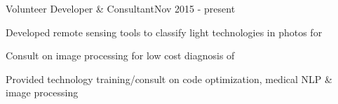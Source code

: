 \documentclass{article}
\newenvironment{**mylist}[2]{
  \subsubsection*{#1\hfill#2}
  \small
  \begin{list}{}{}
    \setlength{\topsep}{0pt}
   \setlength{\itemsep}{1pt}
   \setlength{\parskip}{0pt}
   \setlength{\parsep}{0pt}}{\end{list}\normalsize}
\newcommand{\LU}[1]{\hspace{-1em}{\bf Technologies : #1}}
\def\PT{{\bf(Part Time)}\xspace}
\begin{document}
\begin{**mylist}{ \tabb Volunteer Developer \& Consultant}{Nov 2015 - present}
\item Developed remote sensing tools to classify light technologies in photos for 
\item Consult on image processing for low cost diagnosis of 
\item Provided technology training/consult on code optimization, medical NLP \& image processing
\end{**mylist}

\begin{comment}
\begin{**mylist}{\censor{ComScore}
    \tabb Software Contractor}{June 2016 - Sept 2016}
\item Worked to support large, custom, memory mapped, data store for demographic analysis
\end{**mylist}
\end{comment}

\begin{comment}
\begin{**mylist}{\href{http://www.melinae.com/}{\censor{Melinae}} \PT \tabb Contractor}{March 2016}
\end{**mylist}
\end{comment}
\end{document}
